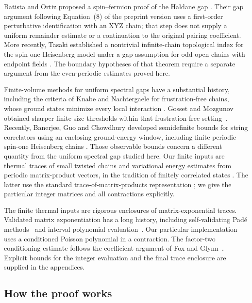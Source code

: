 Batista and Ortiz proposed a spin--fermion proof of the Haldane gap
\cite{BatistaOrtiz2001}. Their gap argument following Equation~(8) of the preprint version
uses a first-order perturbative identification with an XYZ chain;
that step does not supply a uniform remainder estimate or a continuation
to the original pairing coefficient. More recently, Tasaki established
a nontrivial infinite-chain topological index for the spin-one
Heisenberg model under a gap assumption for odd open chains with endpoint fields
\cite[arXiv v4, Assumption~2 and Theorem~3]{Tasaki2025}.
The boundary hypotheses of that theorem require a separate argument
from the even-periodic estimates proved here.

Finite-volume methods for uniform spectral gaps have a substantial
history, including the criteria of Knabe and Nachtergaele for
frustration-free chains, whose ground states minimize every local
interaction \cite{Knabe1988,Nachtergaele1996}.
Gosset and Mozgunov obtained sharper finite-size thresholds within that
frustration-free setting~\cite{GossetMozgunov2016}.
Recently, Banerjee, Guo and Chowdhury developed semidefinite bounds for
string correlators using an enclosing ground-energy window, including
finite periodic spin-one Heisenberg chains
\cite[Equations~(2), (13) and Figure~4]{BanerjeeGuoChowdhury2026}.
Those observable bounds concern a different quantity from the uniform
spectral gap studied here.
Our finite inputs are thermal traces of small twisted chains and
variational energy estimates from periodic matrix-product vectors, in the
tradition of finitely correlated states \cite{FNW1992}.
The latter use the standard trace-of-matrix-products representation
\cite[Section~2.1]{PerezGarcia2007}; we give the particular integer
matrices and all contractions explicitly.

The finite thermal inputs are rigorous enclosures of matrix-exponential
traces. Validated matrix exponentiation has a long history, including
self-validating Pad\'e methods~\cite{BochevMarkov1989} and interval
polynomial evaluation~\cite{GoldsztejnNeumaier2014}. Our particular
implementation uses a conditioned Poisson polynomial in a contraction.
The factor-two conditioning estimate follows the coefficient argument
of Fox and Glynn~\cite[Proposition~1]{FoxGlynn1988}. Explicit bounds
for the integer evaluation and the final trace enclosure are supplied
in the appendices.

\subsection{How the proof works}


